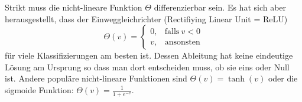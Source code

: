 \documentclass[12pt]{article}
\begin{document}
Strikt muss die nicht-lineare Funktion $\Theta$ differenzierbar
sein. Es hat sich aber herausgestellt, dass der Einweggleichrichter
(Rectifiying Linear Unit = ReLU)
\begin{equation}
  \Theta(v) =
  \begin{cases}
    0, & \text{falls}\ v < 0 \\
    v, & \text{ansonsten}
  \end{cases}
\end{equation}
für viele Klassifizierungen am besten
ist. Dessen Ableitung hat keine eindeutige Lösung am Ursprung so dass man dort
entscheiden muss, ob sie eins oder Null ist. Andere populäre nicht-lineare
Funktionen sind $\Theta(v)=\tanh(v)$ oder die sigmoide Funktion: $\Theta(v)=\frac{1}{1+e^{-v}}$.
\end{document}
